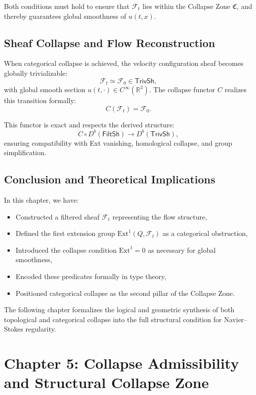 \documentclass[11pt]{article}
\begin{document}
Both conditions must hold to ensure that \( \mathcal{F}_t \) lies within the Collapse Zone \( \mathfrak{C} \), and thereby guarantees global smoothness of \( u(t,x) \).

\subsection{Sheaf Collapse and Flow Reconstruction}

When categorical collapse is achieved, the velocity configuration sheaf becomes globally trivializable:
\[
\mathcal{F}_t \simeq \mathcal{F}_0 \in \mathsf{TrivSh},
\]
with global smooth section \( u(t,\cdot) \in C^\infty(\mathbb{R}^3) \). The collapse functor \( C \) realizes this transition formally:
\[
C(\mathcal{F}_t) = \mathcal{F}_0.
\]

This functor is exact and respects the derived structure:
\[
C \circ D^b(\mathsf{FiltSh}) \to D^b(\mathsf{TrivSh}),
\]
ensuring compatibility with Ext vanishing, homological collapse, and group simplification.

\subsection{Conclusion and Theoretical Implications}

In this chapter, we have:
\begin{itemize}
  \item Constructed a filtered sheaf \( \mathcal{F}_t \) representing the flow structure,
  \item Defined the first extension group \( \mathrm{Ext}^1(Q, \mathcal{F}_t) \) as a categorical obstruction,
  \item Introduced the collapse condition \( \mathrm{Ext}^1 = 0 \) as necessary for global smoothness,
  \item Encoded these predicates formally in type theory,
  \item Positioned categorical collapse as the second pillar of the Collapse Zone.
\end{itemize}

The following chapter formalizes the logical and geometric synthesis of both topological and categorical collapse into the full structural condition for Navier--Stokes regularity.



\section{Chapter 5: Collapse Admissibility and Structural Collapse Zone}
\label{sec:collapse-zone}
\end{document}
